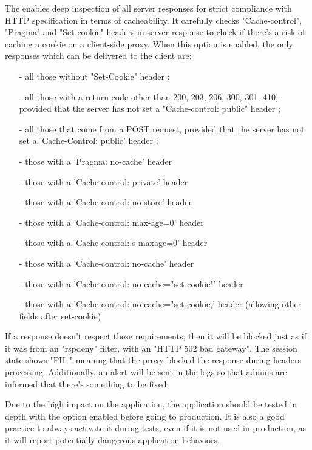   The  enables deep inspection of all server responses for
  strict compliance with HTTP specification in terms of cacheability. It
  carefully checks "Cache-control", "Pragma" and "Set-cookie" headers in server
  response to check if there's a risk of caching a cookie on a client-side
  proxy. When this option is enabled, the only responses which can be delivered
  to the client are:

\begin{itemize}
\item[-] all those without "Set-Cookie" header ;
\item[-] all those with a return code other than 200, 203, 206, 300, 301, 410,
      provided that the server has not set a "Cache-control: public" header ;
\item[-] all those that come from a POST request, provided that the server has not
      set a 'Cache-Control: public' header ;
\item[-] those with a 'Pragma: no-cache' header
\item[-] those with a 'Cache-control: private' header
\item[-] those with a 'Cache-control: no-store' header
\item[-] those with a 'Cache-control: max-age=0' header
\item[-] those with a 'Cache-control: s-maxage=0' header
\item[-] those with a 'Cache-control: no-cache' header
\item[-] those with a 'Cache-control: no-cache="set-cookie"' header
\item[-] those with a 'Cache-control: no-cache="set-cookie,' header
      (allowing other fields after set-cookie)
\end{itemize}

  If a response doesn't respect these requirements, then it will be blocked
  just as if it was from an "rspdeny" filter, with an "HTTP 502 bad gateway".
  The session state shows "PH--" meaning that the proxy blocked the response
  during headers processing. Additionally, an alert will be sent in the logs so
  that admins are informed that there's something to be fixed.

  Due to the high impact on the application, the application should be tested
  in depth with the option enabled before going to production. It is also a
  good practice to always activate it during tests, even if it is not used in
  production, as it will report potentially dangerous application behaviors.

